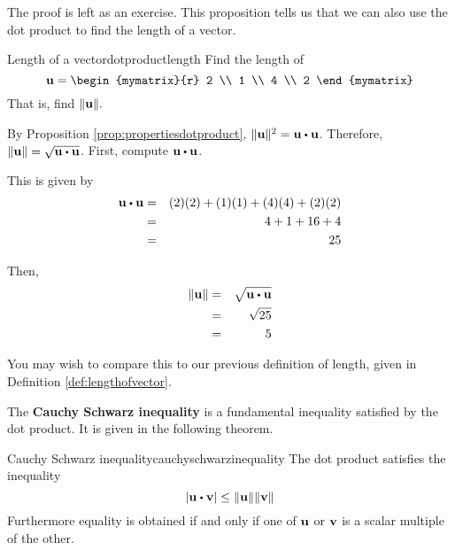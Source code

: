 The proof is left as an exercise. This proposition tells us that we can also use the dot product to find the length of a vector.

\begin{example}{Length of a vector}{dotproductlength}
Find the length of
\begin{equation*}
\vect{u}
=
\begin{mymatrix}{r}
2 \\
1 \\
4 \\
2
\end{mymatrix} 
\end{equation*}
 That is, find $\|{\bf u}\| .$
\end{example}

\begin{solution}
By Proposition \ref{prop:propertiesdotproduct},  $\norm{\vect{u}} ^{2} = \vect{u} \dotprod \vect{u}$. 
Therefore, $\norm{\vect{u}} = \sqrt {\vect{u} \dotprod \vect{u}}$.
First, compute $\vect{u} \dotprod \vect{u}$. 

This is given by 
\begin{eqnarray*}
\vect{u} \dotprod \vect{u}
&=&
(2)(2) + (1)(1) + (4)(4) + (2)(2) \\
&=&
4 + 1 + 16 + 4 \\
&=&
25
\end{eqnarray*}

Then, 
\begin{eqnarray*}
\norm{\vect{u}} 
&=& \sqrt {\vect{u} \dotprod \vect{u}} \\
&=& \sqrt{25} \\
&=& 5
\end{eqnarray*}
\end{solution}

You may wish to compare this to our previous definition of length, 
given in Definition \ref{def:lengthofvector}. 

The \textbf{Cauchy Schwarz inequality} is a fundamental inequality satisfied by the dot product. 
 It is given in the following theorem.

\begin{theorem}{Cauchy Schwarz inequality}{cauchyschwarzinequality}
The dot product satisfies the inequality
\begin{equation}
\abs{\vect{u}\dotprod \vect{v}}\leq \norm{\vect{u}} \norm{\vect{v}}   \label{cauchy}
\end{equation}
Furthermore equality is obtained if and only if one of ${\bf u}$ or ${\bf v}$ is a scalar multiple of the other.
\end{theorem}

